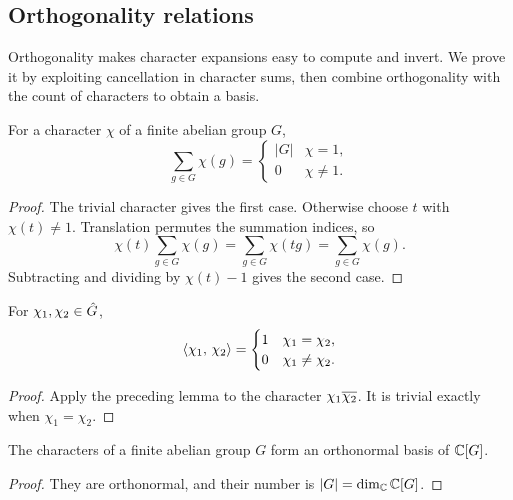 \subsection{Orthogonality relations}
\label{sect2-dual-grpe-abelien-rel-orthogonalite}

Orthogonality makes character expansions easy to compute and invert. We
prove it by exploiting cancellation in character sums, then combine
orthogonality with the count of characters to obtain a basis.

\begin{lem}
\label{lem-orth-character-abelien}
For a character $\chi$ of a finite abelian group $G$,
\begin{equation}
\label{eq-sum-caracteres-grpe-abelien}
 \sum_{g\in G}\chi(g)=
 \begin{cases}|G|&\chi=1,\\0&\chi\neq1.\end{cases}
\end{equation}
\end{lem}
\begin{proof}
The trivial character gives the first case. Otherwise choose $t$ with
$\chi(t)\neq1$. Translation permutes the summation indices, so
\[
 \chi(t)\sum_{g\in G}\chi(g)
 =\sum_{g\in G}\chi(tg)=\sum_{g\in G}\chi(g).
\]
Subtracting and dividing by $\chi(t)-1$ gives the second case.
\end{proof}


\begin{prop}
\label{prop-orthogonalite-car-grpe-abelien}
For $\chi_1,\chi_2\in\hat{G}$,
\[
 \langle \chi_1,\,\chi_2\rangle=\begin{cases}1&\chi_1=\chi_2,\\0&\chi_1\neq\chi_2.\end{cases}
\]
\end{prop}
\begin{proof}
Apply the preceding lemma to the character $\chi_1\overline{\chi_2}$.
It is trivial exactly when $\chi_1=\chi_2$.
\end{proof}


\begin{cor}
The characters of a finite abelian group $G$ form an orthonormal basis of
$\mathbb{C}[G]$.
\end{cor}
\begin{proof}
They are orthonormal, and their number is $|G|=\dim_{\mathbb{C}}\mathbb{C}[G]$.
\end{proof}

